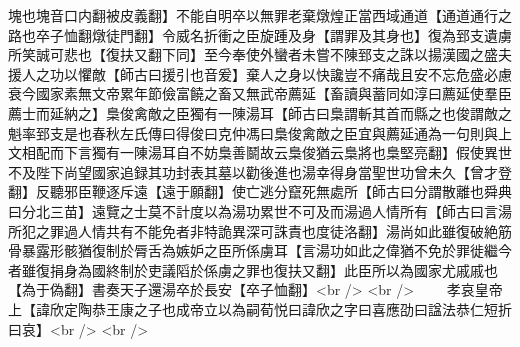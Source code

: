 塊也塊音口内翻被皮義翻】不能自明卒以無罪老棄燉煌正當西域通道【通道通行之路也卒子恤翻燉徒門翻】令威名折衝之臣旋踵及身【謂罪及其身也】復為郅支遺虜所笑誠可悲也【復扶又翻下同】至今奉使外蠻者未嘗不陳郅支之誅以揚漢國之盛夫援人之功以懼敵【師古曰援引也音爰】棄人之身以快讒豈不痛哉且安不忘危盛必慮衰今國家素無文帝累年節儉富饒之畜又無武帝薦延【畜讀與蓄同如淳曰薦延使羣臣薦士而延納之】梟俊禽敵之臣獨有一陳湯耳【師古曰梟謂斬其首而縣之也俊謂敵之魁率郅支是也春秋左氏傳曰得俊曰克仲馮曰梟俊禽敵之臣宜與薦延通為一句則與上文相配而下言獨有一陳湯耳自不妨梟善鬬故云梟俊猶云梟將也梟堅亮翻】假使異世不及陛下尚望國家追録其功封表其墓以勸後進也湯幸得身當聖世功曾未久【曾才登翻】反聽邪臣鞭逐斥遠【遠于願翻】使亡逃分竄死無處所【師古曰分謂散離也舜典曰分北三苗】遠覽之士莫不計度以為湯功累世不可及而湯過人情所有【師古曰言湯所犯之罪過人情共有不能免者非特詭異深可誅責也度徒洛翻】湯尚如此雖復破絶筋骨暴露形骸猶復制於脣舌為嫉妒之臣所係虜耳【言湯功如此之偉猶不免於罪徙繼今者雖復捐身為國終制於吏議䧟於係虜之罪也復扶又翻】此臣所以為國家尤戚戚也【為于偽翻】書奏天子還湯卒於長安【卒子恤翻】<br />
<br />
　　孝哀皇帝上【諱欣定陶恭王康之子也成帝立以為嗣荀悦曰諱欣之字曰喜應劭曰諡法恭仁短折曰哀】<br />
<br />
